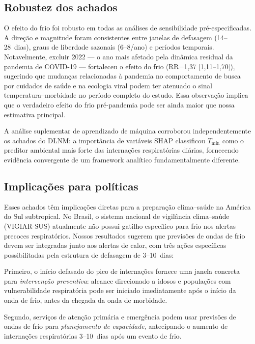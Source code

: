 \documentclass[12pt]{article}
\begin{document}
\subsection{Robustez dos achados}

O efeito do frio foi robusto em todas as análises de sensibilidade
pré-especificadas. A direção e magnitude foram consistentes entre
janelas de defasagem (14--28~dias), graus de liberdade sazonais
(6--8/ano) e períodos temporais. Notavelmente, excluir 2022 --- o
ano mais afetado pela dinâmica residual da pandemia de COVID-19 ---
fortaleceu o efeito do frio (RR=1,37 [1,11--1,70]), sugerindo que
mudanças relacionadas à pandemia no comportamento de busca por
cuidados de saúde e na ecologia viral podem ter atenuado o sinal
temperatura--morbidade no período completo do estudo. Essa observação
implica que o verdadeiro efeito do frio pré-pandemia pode ser ainda
maior que nossa estimativa principal.

A análise suplementar de aprendizado de máquina corroborou
independentemente os achados do DLNM: a importância de variáveis
SHAP classificou $T_\mathrm{mín}$ como o preditor ambiental mais
forte das internações respiratórias diárias, fornecendo evidência
convergente de um framework analítico fundamentalmente diferente.

\subsection{Implicações para políticas}

Esses achados têm implicações diretas para a preparação clima--saúde
na América do Sul subtropical. No Brasil, o sistema nacional de
vigilância clima--saúde (VIGIAR-SUS) atualmente não possui gatilho
específico para frio nos alertas precoces respiratórios. Nossos
resultados sugerem que previsões de ondas de frio devem ser integradas
junto aos alertas de calor, com três ações específicas possibilitadas
pela estrutura de defasagem de 3--10~dias:

Primeiro, o início defasado do pico de internações fornece uma janela
concreta para \emph{intervenção preventiva}: alcance direcionado a
idosos e populações com vulnerabilidade respiratória pode ser iniciado
imediatamente após o início da onda de frio, antes da chegada da onda
de morbidade.

Segundo, serviços de atenção primária e emergência podem usar
previsões de ondas de frio para \emph{planejamento de capacidade},
antecipando o aumento de internações respiratórias 3--10~dias após
um evento de frio.
\end{document}
